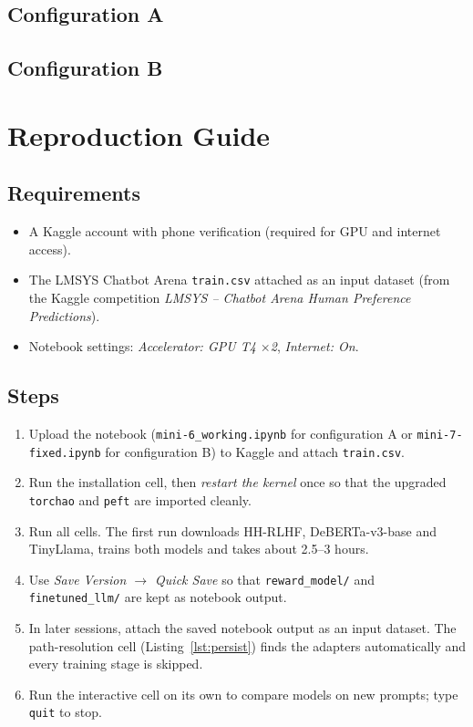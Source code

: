 \section{Configuration A}


\section{Configuration B}


\chapter{Reproduction Guide}
\label{app:repro}

\section{Requirements}
\begin{itemize}
  \item A Kaggle account with phone verification (required for GPU and internet access).
  \item The LMSYS Chatbot Arena \texttt{train.csv} attached as an input dataset (from the Kaggle competition \emph{LMSYS -- Chatbot Arena Human Preference Predictions}).
  \item Notebook settings: \emph{Accelerator: GPU T4 $\times$2}, \emph{Internet: On}.
\end{itemize}

\section{Steps}
\begin{enumerate}
  \item Upload the notebook (\texttt{mini-6\_working.ipynb} for configuration A or \texttt{mini-7-fixed.ipynb} for configuration B) to Kaggle and attach \texttt{train.csv}.
  \item Run the installation cell, then \emph{restart the kernel} once so that the upgraded \texttt{torchao} and \texttt{peft} are imported cleanly.
  \item Run all cells. The first run downloads HH-RLHF, DeBERTa-v3-base and TinyLlama, trains both models and takes about 2.5--3 hours.
  \item Use \emph{Save Version $\rightarrow$ Quick Save} so that \texttt{reward\_model/} and \texttt{finetuned\_llm/} are kept as notebook output.
  \item In later sessions, attach the saved notebook output as an input dataset. The path-resolution cell (Listing~\ref{lst:persist}) finds the adapters automatically and every training stage is skipped.
  \item Run the interactive cell on its own to compare models on new prompts; type \texttt{quit} to stop.
\end{enumerate}

